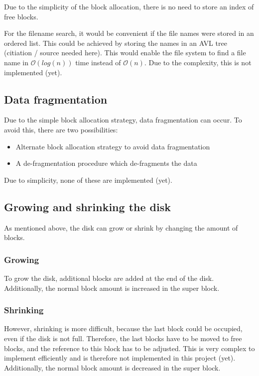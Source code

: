 \documentclass[a4paper,12pt]{article}
\begin{document}
Due to the simplicity of the block allocation, there is no need to store an index of free blocks.

For the filename search, it would be convenient if the file names were stored in an ordered list. This could be achieved by storing the names in an AVL tree (citiation / source needed here). This would enable the file system to
find a file name in $\mathcal{O}(log(n))$ time instead of $\mathcal{O}(n)$. Due to the complexity, this is not implemented (yet).

\subsection{Data fragmentation}

Due to the simple block allocation strategy, data fragmentation can occur. To avoid this, there are two possibilities:

\begin{itemize}
  \item Alternate block allocation strategy to avoid data fragmentation
  \item A de-fragmentation procedure which de-fragments the data
\end{itemize}

Due to simplicity, none of these are implemented (yet).

\subsection{Growing and shrinking the disk}

As mentioned above, the disk can grow or shrink by changing the amount of blocks.

\subsubsection{Growing}

To grow the disk, additional blocks are added at the end of the disk. Additionally, the normal block amount is increased in the super block.

\subsubsection{Shrinking}

However, shrinking is more difficult, because the last block could be occupied, even if the disk is not full. Therefore, the last blocks have to be moved to free blocks, and the reference to this block has to be adjusted. This is very complex to implement efficiently and is therefore not implemented in this project (yet).\\
Additionally, the normal block amount is decreased in the super block.
\end{document}

